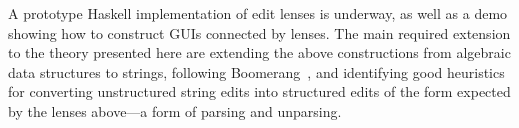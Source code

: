 \documentclass{sigplanconf}
\begin{document}



\label{sec:concl}

A prototype Haskell implementation of edit lenses is underway, as well as a
demo showing how to construct GUIs connected by lenses. 
The main required extension to the theory presented here are extending the
above constructions from algebraic data structures to strings, following
Boomerang~\cite{Boomerang07}, and identifying good heuristics for
converting unstructured string edits into structured edits of the form
expected by the lenses above---a form of parsing and unparsing.
\end{document}
